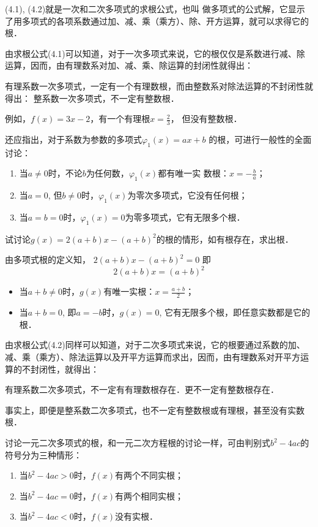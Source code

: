 (4.1), (4.2)就是一次和二次多项式的求根公式，也叫
做多项式的公式解，它显示了用多项式的各项系数通过加、减、乘（乘方）、除、开方运算，就可以求得它的根．

由求根公式(4.1)可以知道，对于一次多项式来说，它的根仅仅是系数进行减、除运算，因而，由有理数系对加、减、乘、除运算的封闭性就得出：

有理系数一次多项式，一定有一个有理数根，而由整数系对除法运算的不封闭性就得出：
整系数一次多项式，不一定有整数根．

例如，$f(x)=3x-2$，有一个有理根$x=\frac{2}{3}$，
但没有整数根．

还应指出，对于系数为参数的多项式$\varphi_1(x)=ax+b$
的根，可进行一般性的全面讨论：
\begin{enumerate}
    \item 当$a\ne 0$时，不论$b$为任何数，$\varphi_1(x)$都有唯一实
    数根：$x=-\frac{b}{a}$；
    \item 当$a=0$, 但$b\ne 0$时，$\varphi_1(x)$为零次多项式，它没有任何根；
    \item 当$a=b=0$时，$\varphi_1(x)=0$为零多项式，它有无限多个根．
\end{enumerate}

\begin{example}
    试讨论$g(x)=2(a+b)x-(a+b)^2$的根的情形，如有根存在，求出根．
\end{example}

\begin{solution}
    由多项式根的定义知，
$2 (a+b) x- (a+b)^2=0$
即
\[2 (a+b) x= (a+b)^2\]
\begin{itemize}
    \item 当$a+b\ne 0$时，$g(x)$有唯一实根：$x=\frac{a+b}{2}$；
    \item 当$a+b=0$, 即$a=-b$时，$g(x)=0$, 它有无限多个根，即任意实数都是它的根．
\end{itemize}
\end{solution}

由求根公式(4.2)同样可以知道，对于二次多项式来说，它的根要通过系数的加、减、乘（乘方）、除法运算以及开平方运算而求出，因而，由有理数系对开平方运算的不封闭性，就得出：

有理系数二次多项式，不一定有有理数根存在．更不一定有整数根存在．

事实上，即便是整系数二次多项式，也不一定有整数根或有理根，甚至没有实数根．

讨论一元二次多项式的根，和一元二次方程根的讨论一样，可由判别式$b^2-4ac$的符号分为三种情形：
\begin{enumerate}
    \item 当$b^2-4ac>0$时，$f(x)$有两个不同实根；
    \item 当$b^2-4ac=0$时，$f(x)$有两个相同实根；
    \item 当$b^2-4ac<0$时，$f(x)$没有实根．
\end{enumerate}

